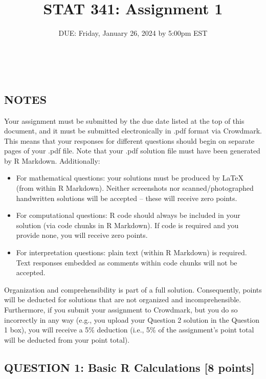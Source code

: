 \documentclass[
]{article}
\title{STAT 341: Assignment 1}
\subtitle{DUE: Friday, January 26, 2024 by 5:00pm EST}
\author{}
\date{\vspace{-2.5em}}
\begin{document}
\maketitle

\(\;\) \(\;\) \(\;\) \(\;\)

\hypertarget{notes}{%
\subsection{NOTES}\label{notes}}

Your assignment must be submitted by the due date listed at the top of
this document, and it must be submitted electronically in .pdf format
via Crowdmark. This means that your responses for different questions
should begin on separate pages of your .pdf file. Note that your .pdf
solution file must have been generated by R Markdown. Additionally:

\begin{itemize}
\item
  For mathematical questions: your solutions must be produced by LaTeX
  (from within R Markdown). Neither screenshots nor scanned/photographed
  handwritten solutions will be accepted -- these will receive zero
  points.
\item
  For computational questions: R code should always be included in your
  solution (via code chunks in R Markdown). If code is required and you
  provide none, you will receive zero points.
\item
  For interpretation questions: plain text (within R Markdown) is
  required. Text responses embedded as comments within code chunks will
  not be accepted.
\end{itemize}

Organization and comprehensibility is part of a full solution.
Consequently, points will be deducted for solutions that are not
organized and incomprehensible. Furthermore, if you submit your
assignment to Crowdmark, but you do so incorrectly in any way (e.g., you
upload your Question 2 solution in the Question 1 box), you will receive
a 5\% deduction (i.e., 5\% of the assignment's point total will be
deducted from your point total).

\newpage

\hypertarget{question-1-basic-r-calculations-8-points}{%
\subsection{QUESTION 1: Basic R Calculations {[}8
points{]}}\label{question-1-basic-r-calculations-8-points}}
\end{document}
